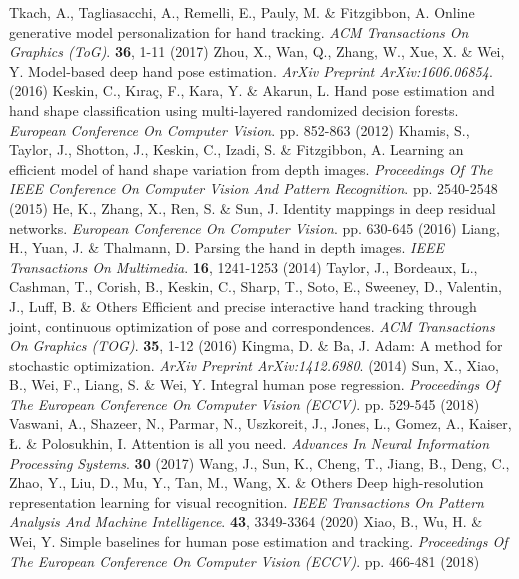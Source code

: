 \documentclass{article}
\begin{document}
\begin{thebibliography}{00}
Tkach, A., Tagliasacchi, A., Remelli, E., Pauly, M. \& Fitzgibbon, A. Online generative model personalization for hand tracking. {\em ACM Transactions On Graphics (ToG)}. \textbf{36}, 1-11 (2017)
Zhou, X., Wan, Q., Zhang, W., Xue, X. \& Wei, Y. Model-based deep hand pose estimation. {\em ArXiv Preprint ArXiv:1606.06854}. (2016)
Keskin, C., Kıraç, F., Kara, Y. \& Akarun, L. Hand pose estimation and hand shape classification using multi-layered randomized decision forests. {\em European Conference On Computer Vision}. pp. 852-863 (2012)
Khamis, S., Taylor, J., Shotton, J., Keskin, C., Izadi, S. \& Fitzgibbon, A. Learning an efficient model of hand shape variation from depth images. {\em Proceedings Of The IEEE Conference On Computer Vision And Pattern Recognition}. pp. 2540-2548 (2015)
He, K., Zhang, X., Ren, S. \& Sun, J. Identity mappings in deep residual networks. {\em European Conference On Computer Vision}. pp. 630-645 (2016)
Liang, H., Yuan, J. \& Thalmann, D. Parsing the hand in depth images. {\em IEEE Transactions On Multimedia}. \textbf{16}, 1241-1253 (2014)
Taylor, J., Bordeaux, L., Cashman, T., Corish, B., Keskin, C., Sharp, T., Soto, E., Sweeney, D., Valentin, J., Luff, B. \& Others Efficient and precise interactive hand tracking through joint, continuous optimization of pose and correspondences. {\em ACM Transactions On Graphics (TOG)}. \textbf{35}, 1-12 (2016)
Kingma, D. \& Ba, J. Adam: A method for stochastic optimization. {\em ArXiv Preprint ArXiv:1412.6980}. (2014)
Sun, X., Xiao, B., Wei, F., Liang, S. \& Wei, Y. Integral human pose regression. {\em Proceedings Of The European Conference On Computer Vision (ECCV)}. pp. 529-545 (2018)
Vaswani, A., Shazeer, N., Parmar, N., Uszkoreit, J., Jones, L., Gomez, A., Kaiser, Ł. \& Polosukhin, I. Attention is all you need. {\em Advances In Neural Information Processing Systems}. \textbf{30} (2017)
Wang, J., Sun, K., Cheng, T., Jiang, B., Deng, C., Zhao, Y., Liu, D., Mu, Y., Tan, M., Wang, X. \& Others Deep high-resolution representation learning for visual recognition. {\em IEEE Transactions On Pattern Analysis And Machine Intelligence}. \textbf{43}, 3349-3364 (2020)
Xiao, B., Wu, H. \& Wei, Y. Simple baselines for human pose estimation and tracking. {\em Proceedings Of The European Conference On Computer Vision (ECCV)}. pp. 466-481 (2018)
\end{thebibliography}
\end{document}
